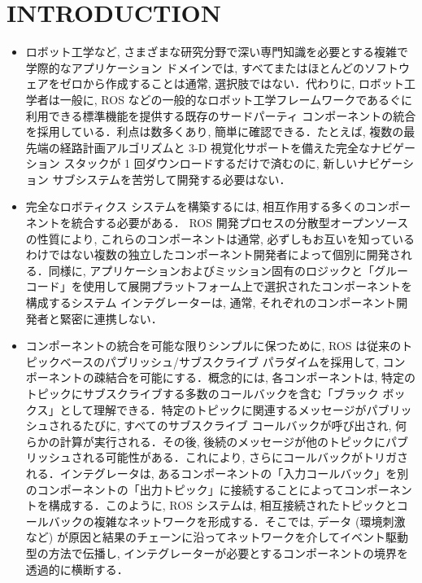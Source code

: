 
\section{INTRODUCTION}
\label{sec: introduction}

\begin{frame}{}
\begin{itemize}
\item ロボット工学など, さまざまな研究分野で深い専門知識を必要とする複雑で学際的なアプリケーション ドメインでは, すべてまたはほとんどのソフトウェアをゼロから作成することは通常, 選択肢ではない．代わりに, ロボット工学者は一般に, ROS などの一般的なロボット工学フレームワークであるぐに利用できる標準機能を提供する既存のサードパーティ コンポーネントの統合を採用している．利点は数多くあり, 簡単に確認できる．たとえば, 複数の最先端の経路計画アルゴリズムと 3-D 視覚化サポートを備えた完全なナビゲーション スタックが 1 回ダウンロードするだけで済むのに, 新しいナビゲーション サブシステムを苦労して開発する必要はない．
\end{itemize}
\end{frame}

\begin{frame}{}
\begin{itemize}
\item 完全なロボティクス システムを構築するには, 相互作用する多くのコンポーネントを統合する必要がある． ROS 開発プロセスの分散型オープンソースの性質により, これらのコンポーネントは通常, 必ずしもお互いを知っているわけではない複数の独立したコンポーネント開発者によって個別に開発される．同様に, アプリケーションおよびミッション固有のロジックと「グルー コード」を使用して展開プラットフォーム上で選択されたコンポーネントを構成するシステム インテグレーターは, 通常, それぞれのコンポーネント開発者と緊密に連携しない．
\end{itemize}
\end{frame}

\begin{frame}{}
\begin{itemize}
\item コンポーネントの統合を可能な限りシンプルに保つために, ROS は従来のトピックベースのパブリッシュ/サブスクライブ パラダイムを採用して, コンポーネントの疎結合を可能にする．概念的には, 各コンポーネントは, 特定のトピックにサブスクライブする多数のコールバックを含む「ブラック ボックス」として理解できる．特定のトピックに関連するメッセージがパブリッシュされるたびに, すべてのサブスクライブ コールバックが呼び出され, 何らかの計算が実行される．その後, 後続のメッセージが他のトピックにパブリッシュされる可能性がある．これにより, さらにコールバックがトリガされる．インテグレータは, あるコンポーネントの「入力コールバック」を別のコンポーネントの「出力トピック」に接続することによってコンポーネントを構成する．このように, ROS システムは, 相互接続されたトピックとコールバックの複雑なネットワークを形成する．そこでは, データ (環境刺激など) が原因と結果のチェーンに沿ってネットワークを介してイベント駆動型の方法で伝播し, インテグレーターが必要とするコンポーネントの境界を透過的に横断する．
\end{itemize}
\end{frame}

